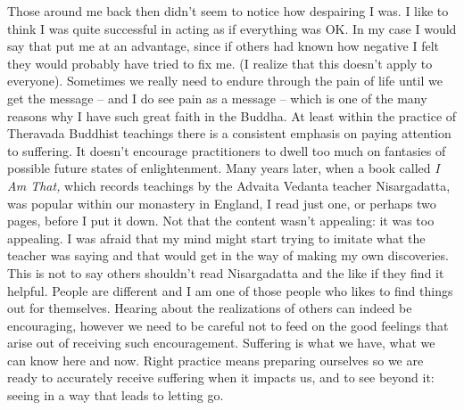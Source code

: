 Those around me back then didn't seem to notice how despairing I was. I
like to think I was quite successful in acting as if everything was OK.
In my case I would say that put me at an advantage, since if others had
known how negative I felt they would probably have tried to fix me. (I
realize that this doesn't apply to everyone). Sometimes we really need
to endure through the pain of life until we get the message -- and I do
see pain as a message -- which is one of the many reasons why I have
such great faith in the Buddha. At least within the practice of
Theravada Buddhist teachings there is a consistent emphasis on paying
attention to suffering. It doesn't encourage practitioners to dwell too
much on fantasies of possible future states of enlightenment. Many years
later, when a book called \emph{I Am That,} which records teachings by
the Advaita Vedanta teacher Nisargadatta, was popular within our
monastery in England, I read just one, or perhaps two pages, before I
put it down. Not that the content wasn't appealing: it was too
appealing. I was afraid that my mind might start trying to imitate what
the teacher was saying and that would get in the way of making my own
discoveries. This is not to say others shouldn't read Nisargadatta and
the like if they find it helpful. People are different and I am one of
those people who likes to find things out for themselves. Hearing about
the realizations of others can indeed be encouraging, however we need to
be careful not to feed on the good feelings that arise out of receiving
such encouragement. Suffering is what we have, what we can know here and
now. Right practice means preparing ourselves so we are ready to
accurately receive suffering when it impacts us, and to see beyond it:
seeing in a way that leads to letting go.

